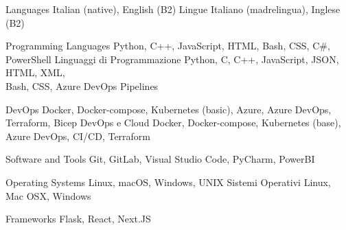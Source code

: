 \begin{cvskills}    
\ifenglish
\cvskill
    {Languages} %
    {Italian (native), English (B2)}
\else
\cvskill
    {Lingue} %
    {Italiano (madrelingua), Inglese (B2)}
\fi
\end{cvskills}




\begin{cvskills}


\ifenglish
\cvskill
{Programming Languages} %
{Python, C++, JavaScript, HTML, Bash, CSS, C\#, PowerShell} %
\else
\cvskill
{Linguaggi di Programmazione} %
{Python, C, C++, JavaScript, JSON, HTML, XML,\\
 Bash, CSS, Azure DevOps Pipelines} %
\fi


\ifenglish
\cvskill
{DevOps} %
{Docker, Docker-compose, Kubernetes (basic), Azure, Azure DevOps, Terraform, Bicep} %
\else
\cvskill
{DevOps e Cloud} %
{Docker, Docker-compose, Kubernetes (base),\\
 Azure DevOps, CI/CD, Terraform} %
\fi


\cvskill
{Software and Tools} %
{Git, GitLab, Visual Studio Code, PyCharm, PowerBI} %


\ifenglish
\cvskill
{Operating Systems} %
{Linux, macOS, Windows, UNIX} %
\else
\cvskill
{Sistemi Operativi} %
{Linux, Mac OSX, Windows} %
\fi


\cvskill
{Frameworks} %
{Flask, React, Next.JS} %


\end{cvskills}